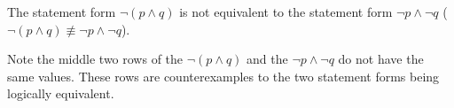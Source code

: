 \guard




\begin{exmp}
  The statement form $\neg(p\wedge q)$ is not equivalent to the statement form $\neg p \wedge \neg q$ ($\neg(p\wedge q) \not\equiv \neg p \wedge \neg q$).
  \begin{center}
    
  \end{center}
  Note the middle two rows of the $\neg(p\wedge q)$ and the $\neg p\wedge\neg q$ do not have the same values.
  These rows are counterexamples to the two statement forms being logically equivalent.
\end{exmp}
